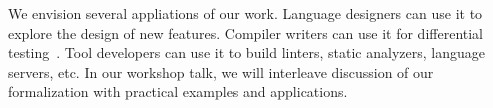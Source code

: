\documentclass[11pt]{article}
\begin{document}
We envision several appliations of our work. Language designers can
use it to explore the design of new features. Compiler writers can use
it for differential testing~\cite{gauntlet}. Tool developers can use
it to build linters, static analyzers, language servers, etc. In
our \pfour workshop talk, we will interleave discussion of our
formalization with practical examples and applications.

{\footnotesize


}
%
%
\end{document}
